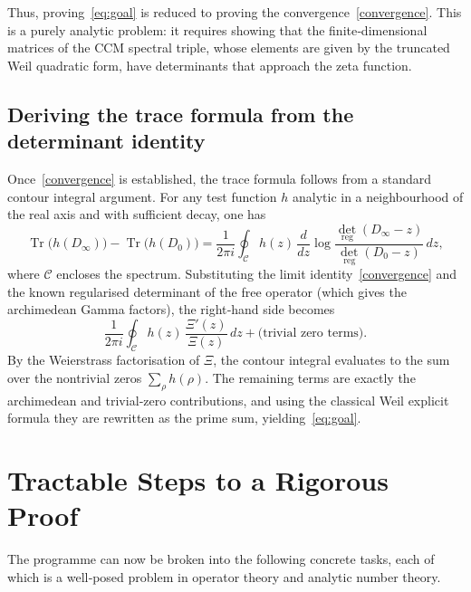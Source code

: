 \documentclass[12pt,a4paper]{article}
\newcommand{\deter}{\operatorname{det}}
\newcommand{\tr}{\operatorname{Tr}}
\begin{document}
Thus, proving~\eqref{eq:goal} is reduced to proving the convergence~\eqref{convergence}.  This is a purely analytic problem: it requires showing that the finite‑dimensional matrices of the CCM spectral triple, whose elements are given by the truncated Weil quadratic form, have determinants that approach the zeta function.

\subsection{Deriving the trace formula from the determinant identity}

Once~\eqref{convergence} is established, the trace formula follows from a standard contour integral argument.  For any test function \(h\) analytic in a neighbourhood of the real axis and with sufficient decay, one has
\[
\tr\bigl( h(D_\infty) \bigr) - \tr\bigl( h(D_0) \bigr)
= \frac{1}{2\pi i} \oint_{\mathcal{C}} h(z)\, \frac{d}{dz}\log \frac{\deter_{\text{reg}}(D_\infty - z)}{\deter_{\text{reg}}(D_0 - z)}\,dz,
\]
where \(\mathcal{C}\) encloses the spectrum.  Substituting the limit identity~\eqref{convergence} and the known regularised determinant of the free operator (which gives the archimedean Gamma factors), the right‑hand side becomes
\[
\frac{1}{2\pi i} \oint_{\mathcal{C}} h(z)\, \frac{\Xi'(z)}{\Xi(z)}\,dz + \text{(trivial zero terms)}.
\]
By the Weierstrass factorisation of \(\Xi\), the contour integral evaluates to the sum over the nontrivial zeros \(\sum_{\rho} h(\rho)\).  The remaining terms are exactly the archimedean and trivial‑zero contributions, and using the classical Weil explicit formula they are rewritten as the prime sum, yielding~\eqref{eq:goal}.

\section{Tractable Steps to a Rigorous Proof}

The programme can now be broken into the following concrete tasks, each of which is a well‑posed problem in operator theory and analytic number theory.
\end{document}

